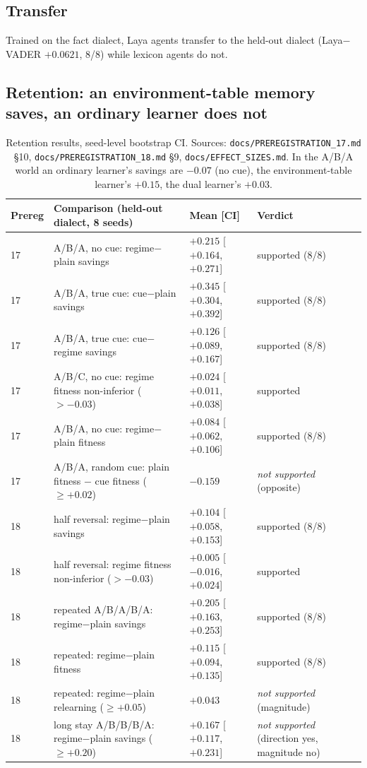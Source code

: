 \documentclass[11pt]{article}
\begin{document}
\subsection{Transfer}
Trained on the fact dialect, Laya agents transfer to the held-out dialect (Laya$-$VADER $+0.0621$, 8/8) while lexicon agents do not.


\subsection{Retention: an environment-table memory saves, an ordinary learner does not}
\begin{table}[h]\centering\small
\begin{tabular}{@{}lp{7.2cm}p{3.4cm}p{3.2cm}@{}}\toprule
Prereg & Comparison (held-out dialect, 8 seeds) & Mean [CI] & Verdict\\\midrule
17 & A/B/A, no cue: regime$-$plain savings & $+0.215$ [$+0.164$, $+0.271$] & supported (8/8)\\
17 & A/B/A, true cue: cue$-$plain savings & $+0.345$ [$+0.304$, $+0.392$] & supported (8/8)\\
17 & A/B/A, true cue: cue$-$regime savings & $+0.126$ [$+0.089$, $+0.167$] & supported (8/8)\\
17 & A/B/C, no cue: regime fitness non-inferior ($>-0.03$) & $+0.024$ [$+0.011$, $+0.038$] & supported\\
17 & A/B/A, no cue: regime$-$plain fitness & $+0.084$ [$+0.062$, $+0.106$] & supported (8/8)\\
17 & A/B/A, random cue: plain fitness $-$ cue fitness ($\ge+0.02$) & $-0.159$ & \emph{not supported} (opposite)\\
18 & half reversal: regime$-$plain savings & $+0.104$ [$+0.058$, $+0.153$] & supported (8/8)\\
18 & half reversal: regime fitness non-inferior ($>-0.03$) & $+0.005$ [$-0.016$, $+0.024$] & supported\\
18 & repeated A/B/A/B/A: regime$-$plain savings & $+0.205$ [$+0.163$, $+0.253$] & supported (8/8)\\
18 & repeated: regime$-$plain fitness & $+0.115$ [$+0.094$, $+0.135$] & supported (8/8)\\
18 & repeated: regime$-$plain relearning ($\ge+0.05$) & $+0.043$ & \emph{not supported} (magnitude)\\
18 & long stay A/B/B/B/A: regime$-$plain savings ($\ge+0.20$) & $+0.167$ [$+0.117$, $+0.231$] & \emph{not supported} (direction yes, magnitude no)\\\bottomrule
\end{tabular}
\caption{\label{tab:retention}Retention results, seed-level bootstrap CI. Sources: \texttt{docs/PREREGISTRATION\_17.md} \S10, \texttt{docs/PREREGISTRATION\_18.md} \S9, \texttt{docs/EFFECT\_SIZES.md}. In the A/B/A world an ordinary learner's savings are $-0.07$ (no cue), the environment-table learner's $+0.15$, the dual learner's $+0.03$.}
\end{table}
\end{document}
